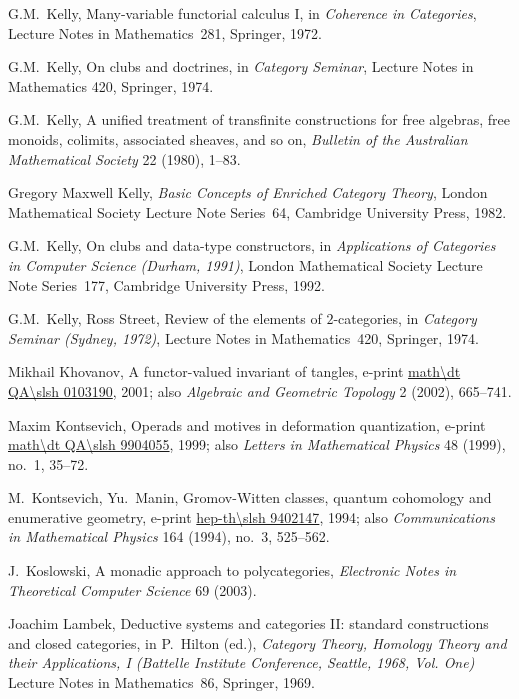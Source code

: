 \begin{thebibliography}{c9999}
G.M.~Kelly, 
Many-variable functorial calculus I,
in
\emph{Coherence in Categories},
Lecture Notes in Mathematics~281,
Springer, 1972.

G.M.~Kelly,
On clubs and doctrines,
in \emph{Category Seminar}, Lecture Notes in Mathematics 420,
Springer, 1974.

G.M.~Kelly,
A unified treatment of transfinite constructions for free algebras, free
monoids, colimits, associated sheaves, and so on,
\emph{Bulletin of the Australian Mathematical Society} 22 (1980), 1--83.

Gregory Maxwell Kelly, 
\emph{Basic Concepts of Enriched Category Theory},
London Mathematical Society Lecture Note Series~64,
Cambridge University Press, 1982.

G.M.~Kelly, 
On clubs and data-type constructors,
in 
\emph{Applications of Categories in Computer Science (Durham, 1991)},
London Mathematical Society Lecture Note Series~177,
Cambridge University Press, 1992.
 
G.M.~Kelly, Ross Street, 
Review of the elements of $2$-categories, 
in
\emph{Category Seminar (Sydney, 1972)},
Lecture Notes in Mathematics~420,
Springer, 1974.

Mikhail Khovanov,
A functor-valued invariant of tangles,
e-print \url{math\dt QA\slsh 0103190}, 2001;
also
\emph{Algebraic and Geometric Topology} 2 (2002), 665--741.

Maxim Kontsevich, 
Operads and motives in deformation quantization,
e-print \url{math\dt QA\slsh 9904055}, 1999; 
also 
\emph{Letters in Mathematical Physics} 48 (1999), no.~1, 35--72.

M.~Kontsevich, Yu.~Manin, 
Gromov-Witten classes, quantum cohomology and enumerative geometry,
e-print \url{hep-th\slsh 9402147}, 1994; 
also
\emph{Communications in Mathematical Physics} 164 (1994), no.~3, 525--562.

J.~Koslowski,
A monadic approach to polycategories,
\emph{Electronic Notes in Theoretical Computer Science} 69 (2003).

Joachim Lambek, 
Deductive systems and categories II: standard constructions
and closed categories,
in
P.~Hilton (ed.), 
\emph{Category Theory, Homology Theory and their Applications, I
(Battelle Institute Conference, Seattle, 1968, Vol. One)}
Lecture Notes in Mathematics~86,
Springer, 1969.


\end{thebibliography}
